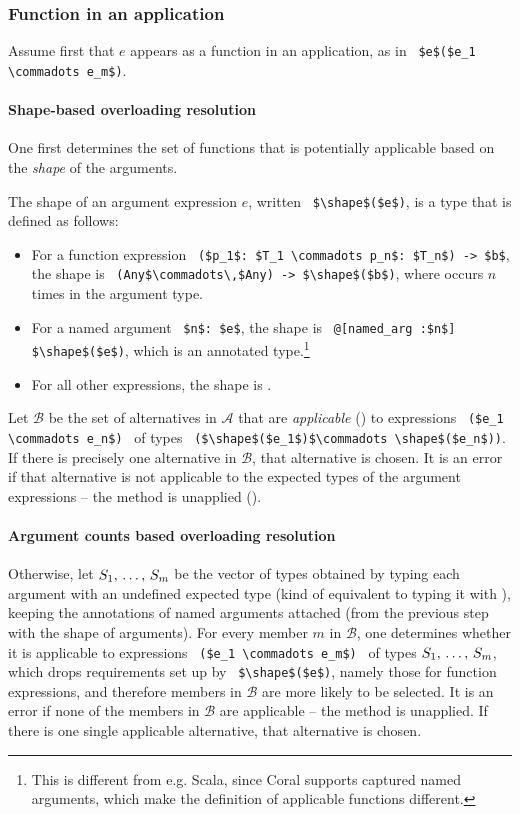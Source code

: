 \subsubsection{Function in an application}

Assume first that $e$ appears as a function in an application, as in ~\lstinline!$e$($e_1 \commadots e_m$)!.

\paragraph{Shape-based overloading resolution}
One first determines the set of functions that is potentially applicable based on the {\em shape} of the arguments. 

The shape of an argument expression $e$, written ~\lstinline!$\shape$($e$)!, is a type that is defined as follows:
\begin{itemize}
\item For a function expression ~\lstinline!($p_1$: $T_1 \commadots p_n$: $T_n$) -> $b$!, the shape is ~\lstinline!(Any$\commadots\,$Any) -> $\shape$($b$)!, where  occurs $n$ times in the argument type. 
\item For a named argument ~\lstinline!$n$: $e$!, the shape is ~\lstinline!@[named_arg :$n$] $\shape$($e$)!, which is an annotated type.\footnote{This is different from e.g. Scala, since Coral supports captured named arguments, which make the definition of applicable functions different.} %
\item For all other expressions, the shape is . 
\end{itemize}

Let $\mathcal{B}$ be the set of alternatives in $\mathcal{A}$ that are {\em applicable} () to expressions ~\lstinline!($e_1 \commadots e_n$)!~ of types ~\lstinline!($\shape$($e_1$)$\commadots \shape$($e_n$))!. If there is precisely one alternative in $\mathcal{B}$, that alternative is chosen. It is an error if that alternative is not applicable to the expected types of the argument expressions -- the method is unapplied (). 

\paragraph{Argument counts based overloading resolution}
Otherwise, let $S_1 ,\, \ldots ,\, S_m$ be the vector of types obtained by typing each argument with an undefined expected type (kind of equivalent to typing it with ), keeping the annotations of named arguments attached (from the previous step with the shape of arguments). For every member $m$ in $\mathcal{B}$, one determines whether it is applicable to expressions ~\lstinline!($e_1 \commadots e_m$)!~ of types $S_1 ,\, \ldots ,\, S_m$, which drops requirements set up by ~\lstinline!$\shape$($e$)!, namely those for function expressions, and therefore members in $\mathcal{B}$ are more likely to be selected. It is an error if none of the members in $\mathcal{B}$ are applicable -- the method is unapplied. If there is one single applicable alternative, that alternative is chosen. 

